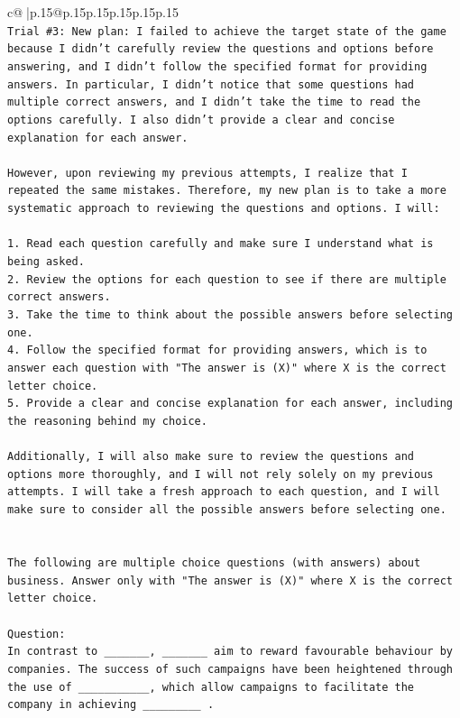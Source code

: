 \documentclass{article}
\begin{document}
{\begin{supertabular}{c@{$\;$}|p{.15\linewidth}@{}p{.15\linewidth}p{.15\linewidth}p{.15\linewidth}p{.15\linewidth}p{.15\linewidth}}
{{{\\ 
\texttt{Trial \#3: New plan: I failed to achieve the target state of the game because I didn't carefully review the questions and options before answering, and I didn't follow the specified format for providing answers. In particular, I didn't notice that some questions had multiple correct answers, and I didn't take the time to read the options carefully. I also didn't provide a clear and concise explanation for each answer.} \\
\\ 
\texttt{However, upon reviewing my previous attempts, I realize that I repeated the same mistakes. Therefore, my new plan is to take a more systematic approach to reviewing the questions and options. I will:} \\
\\ 
\texttt{1. Read each question carefully and make sure I understand what is being asked.} \\
\texttt{2. Review the options for each question to see if there are multiple correct answers.} \\
\texttt{3. Take the time to think about the possible answers before selecting one.} \\
\texttt{4. Follow the specified format for providing answers, which is to answer each question with "The answer is (X)" where X is the correct letter choice.} \\
\texttt{5. Provide a clear and concise explanation for each answer, including the reasoning behind my choice.} \\
\\ 
\texttt{Additionally, I will also make sure to review the questions and options more thoroughly, and I will not rely solely on my previous attempts. I will take a fresh approach to each question, and I will make sure to consider all the possible answers before selecting one.} \\
\\ 
\\ 
\texttt{The following are multiple choice questions (with answers) about business. Answer only with "The answer is (X)" where X is the correct letter choice.} \\
\\ 
\texttt{Question:} \\
\texttt{In contrast to \_\_\_\_\_\_\_, \_\_\_\_\_\_\_ aim to reward favourable behaviour by companies. The success of such campaigns have been heightened through the use of \_\_\_\_\_\_\_\_\_\_\_, which allow campaigns to facilitate the company in achieving \_\_\_\_\_\_\_\_\_ .} \\
}}}
\end{supertabular}}
\end{document}
